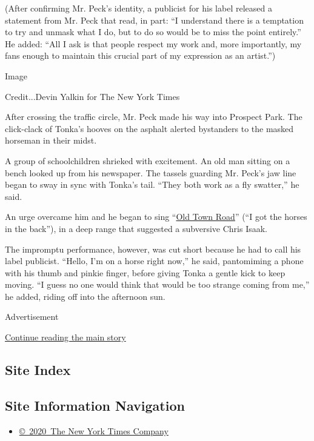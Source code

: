 (After confirming Mr. Peck's identity, a publicist for his label
released a statement from Mr. Peck that read, in part: ``I understand
there is a temptation to try and unmask what I do, but to do so would be
to miss the point entirely.'' He added: ``All I ask is that people
respect my work and, more importantly, my fans enough to maintain this
crucial part of my expression as an artist.'')

Image

Credit...Devin Yalkin for The New York Times

After crossing the traffic circle, Mr. Peck made his way into Prospect
Park. The click-clack of Tonka's hooves on the asphalt alerted
bystanders to the masked horseman in their midst.

A group of schoolchildren shrieked with excitement. An old man sitting
on a bench looked up from his newspaper. The tassels guarding Mr. Peck's
jaw line began to sway in sync with Tonka's tail. ``They both work as a
fly swatter,'' he said.

An urge overcame him and he began to sing
``\href{https://www.nytimes.com/2019/05/10/arts/music/old-town-road-lil-nas-x.html}{Old
Town Road}'' (``I got the horses in the back''), in a deep range that
suggested a subversive Chris Isaak.

The impromptu performance, however, was cut short because he had to call
his label publicist. ``Hello, I'm on a horse right now,'' he said,
pantomiming a phone with his thumb and pinkie finger, before giving
Tonka a gentle kick to keep moving. ``I guess no one would think that
would be too strange coming from me,'' he added, riding off into the
afternoon sun.

Advertisement

\protect\hyperlink{after-bottom}{Continue reading the main story}

\hypertarget{site-index}{%
\subsection{Site Index}\label{site-index}}

\hypertarget{site-information-navigation}{%
\subsection{Site Information
Navigation}\label{site-information-navigation}}

\begin{itemize}
\tightlist
\item
  \href{https://help.nytimes.com/hc/en-us/articles/115014792127-Copyright-notice}{©~2020~The
  New York Times Company}
\end{itemize}

